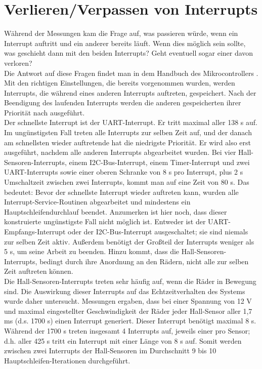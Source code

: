 \section{Verlieren/Verpassen von Interrupts}
Während der Messungen kam die Frage auf, was passieren würde, wenn ein Interrupt auftritt und ein anderer bereits läuft.
Wenn dies möglich sein sollte, was geschieht dann mit den beiden Interrupts? Geht eventuell sogar einer davon verloren?\\
Die Antwort auf diese Fragen findet man in dem Handbuch des Mikrocontrollers \cite{ATMEGA_MANUAL}. Mit
den richtigen Einstellungen, die bereits vorgenommen wurden, werden Interrupts, die während eines anderen
Interrupts auftreten, gespeichert. Nach der Beendigung des laufenden Interrupts werden die anderen gespeicherten
ihrer Priorität nach ausgeführt.\\
Der schnellste Interrupt ist der UART-Interrupt. Er tritt maximal aller 138 \textmu{}s auf.
Im ungünstigsten Fall treten alle Interrupts zur selben
Zeit auf, und der danach am schnellsten wieder auftretende hat die niedrigste Priorität. Er wird also erst ausgeführt,
nachdem alle anderen Interrupts abgearbeitet wurden. Bei vier Hall-Sensoren-Interrupts, einem I2C-Bus-Interrupt,
einem Timer-Interrupt und zwei UART-Interrupts sowie einer oberen Schranke von 8 \textmu{}s pro Interrupt, plus
2 \textmu{}s Umschaltzeit zwischen zwei Interrupts, kommt man auf eine Zeit von 80 \textmu{}s.
Das bedeutet: Bevor der schnellste Interrupt wieder auftreten kann, wurden alle Interrupt-Service-Routinen
abgearbeitet und mindestens ein Hauptschleifendurchlauf beendet. Anzumerken ist hier noch, dass dieser konstruierte
ungünstigste Fall nicht möglich ist. Entweder ist der UART-Empfangs-Interrupt oder der I2C-Bus-Interrupt ausgeschaltet; sie
sind niemals zur selben Zeit aktiv. Außerdem benötigt der Großteil der Interrupts weniger als 5 \textmu{}s, um
seine Arbeit zu beenden. Hinzu kommt, dass die Hall-Sensoren-Interrupts, bedingt durch ihre Anordnung an den
Rädern, nicht alle zur selben Zeit auftreten können.\\
Die Hall-Sensoren-Interrupts treten sehr häufig auf, wenn die Räder in
Bewegung sind. Die Auswirkung dieser Interrupts auf das Echtzeitverhalten des Systems wurde daher
untersucht. Messungen ergaben, dass bei einer Spannung von 12 V und maximal
eingestellter Geschwindigkeit der Räder jeder Hall-Sensor aller 1,7 ms (d.s. 1700 \textmu{}s) einen Interrupt generiert.
Dieser Interrupt benötigt maximal 8 \textmu{}s. Während der 1700 \textmu{}s
treten insgesamt 4 Interrupts auf, jeweils einer pro Sensor; d.h. aller 425 \textmu{}s tritt ein Interrupt mit einer Länge
von 8 \textmu{}s auf. Somit werden zwischen zwei Interrupts der Hall-Sensoren im Durchschnitt 9 bis 10 Hauptschleifen-Iterationen
durchgeführt.

